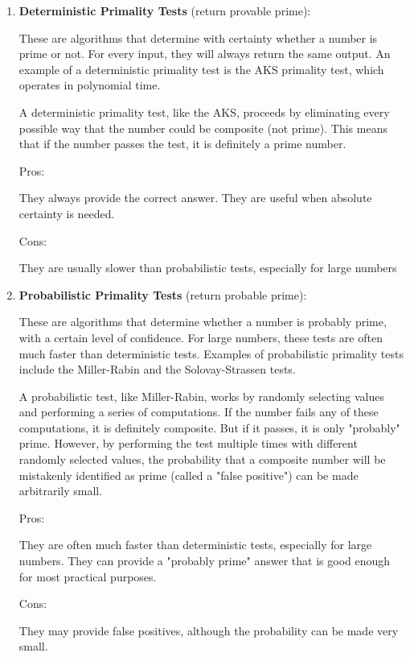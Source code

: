 \documentclass[12pt,openany]{book}
\theoremstyle{definition}
\begin{document}
	\begin{enumerate}
		\item \textbf{Deterministic Primality Tests} (return provable prime):
		
		These are algorithms that determine with certainty whether a number is prime or not. For every input, they will always return the same output. An example of a deterministic primality test is the AKS primality test, which operates in polynomial time.
		
		A deterministic primality test, like the AKS, proceeds by eliminating every possible way that the number could be composite (not prime). This means that if the number passes the test, it is definitely a prime number.
		
		Pros:
		
		They always provide the correct answer.
		They are useful when absolute certainty is needed.
		
		Cons:
		
		They are usually slower than probabilistic tests, especially for large numbers
		\vspace{4pt}
		\item \textbf{Probabilistic Primality Tests} (return probable prime):
		
		These are algorithms that determine whether a number is probably prime, with a certain level of confidence. For large numbers, these tests are often much faster than deterministic tests. Examples of probabilistic primality tests include the Miller-Rabin and the Solovay-Strassen tests.
		
		A probabilistic test, like Miller-Rabin, works by randomly selecting values and performing a series of computations. If the number fails any of these computations, it is definitely composite. But if it passes, it is only "probably" prime. However, by performing the test multiple times with different randomly selected values, the probability that a composite number will be mistakenly identified as prime (called a "false positive") can be made arbitrarily small.
		
		Pros:
		
		They are often much faster than deterministic tests, especially for large numbers.
		They can provide a "probably prime" answer that is good enough for most practical purposes.
		
		Cons:
		
		They may provide false positives, although the probability can be made very small.
	\end{enumerate}
	
\end{document}
